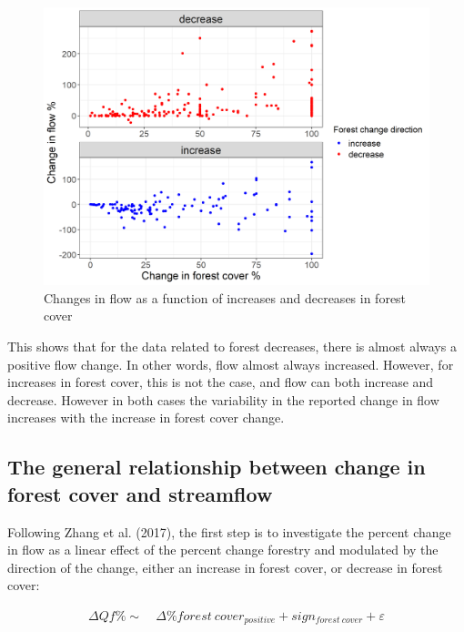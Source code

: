 \documentclass[]{elsarticle} %
\begin{document}
\begin{figure}
\includegraphics[width=0.9\linewidth]{Increase_decrease} \caption{Changes in flow as a function of increases and decreases in forest cover}\label{fig:increasedecrease}
\end{figure}

This shows that for the data related to forest decreases, there is almost always a positive flow change. In other words, flow almost always increased. However, for increases in forest cover, this is not the case, and flow can both increase and decrease. However in both cases the variability in the reported change in flow increases with the increase in forest cover change.

\hypertarget{the-general-relationship-between-change-in-forest-cover-and-streamflow}{%
\subsection{The general relationship between change in forest cover and streamflow}\label{the-general-relationship-between-change-in-forest-cover-and-streamflow}}

Following Zhang et al. (2017), the first step is to investigate the percent change in flow as a linear effect of the percent change forestry and modulated by the direction of the change, either an increase in forest cover, or decrease in forest cover:

\[\tag{3}
\begin{aligned}
\Delta Qf \% \sim ~ &\Delta \% forest~cover_{positive} + sign_{forest~cover} + \varepsilon
\end{aligned}\]
\end{document}
